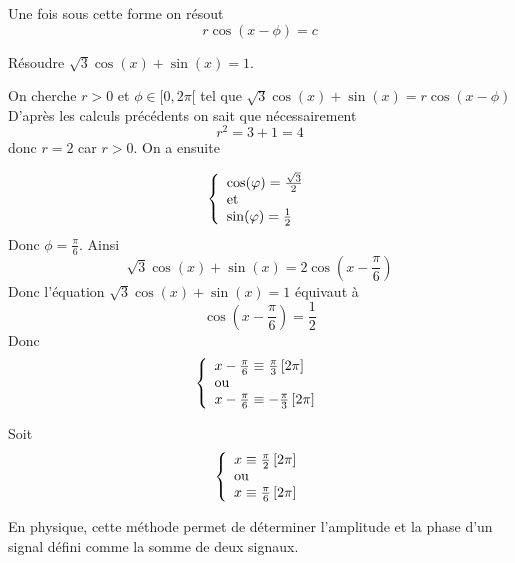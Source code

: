 \documentclass[a4paper, 11pt]{article}
\begin{document}
Une fois sous cette forme on résout
$$r\cos(x-\phi) = c$$


\begin{exemple}
Résoudre $\sqrt{3}\cos{(x)}+\sin{(x)}=1$.
\end{exemple}

\begin{cor}
On cherche $r>0$ et $\phi\in [0,2\pi[$  tel que   $\sqrt{3}\cos{(x)}+\sin{(x)} =r \cos(x-\phi)$
D'après les calculs précédents on sait que nécessairement 
$$r^2 =3+1= 4$$
donc $r=2$ car $r>0$. On a ensuite 

$$
\left\{ \begin{array}{l}
\cos(\phi) = \frac{\sqrt{3}}{2}\\
\textmd{et}\\
\sin(\phi) = \frac{1}{2}
\end{array}\right.$$
Donc $\phi= \frac{\pi}{6}$. Ainsi 
$$\sqrt{3}\cos{(x)}+\sin{(x)} =2 \cos(x-\frac{\pi}{6})$$
Donc l'équation $\sqrt{3}\cos{(x)}+\sin{(x)} =1$ équivaut à 
$$\cos(x-\frac{\pi}{6})=\frac{1}{2}$$
Donc 
$$
\left\{ \begin{array}{l}
x-\frac{\pi}{6}\equiv \frac{\pi}{3}\,  [2\pi]\\
\textmd{ou }\\
x-\frac{\pi}{6}\equiv -\frac{\pi}{3}\,  [2\pi]\\
\end{array}\right.$$

Soit 
$$
\left\{ \begin{array}{l}
x\equiv \frac{\pi}{2}\,  [2\pi]\\
\textmd{ou }\\
x\equiv \frac{\pi}{6}\,  [2\pi]\\
\end{array}\right.$$

\end{cor}

\begin{rem}
En physique, cette m\'ethode permet de d\'eterminer l'amplitude et la phase d'un signal d\'efini comme la somme de deux signaux.
\end{rem}


%
%
%
%
%
%
%
\end{document}
